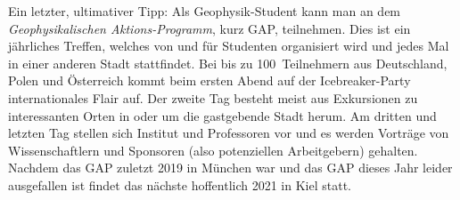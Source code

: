 \begin{multicols}{2}
Ein letzter, ultimativer Tipp: Als Geophysik-Student kann man an dem \emph{Geophysikalischen Aktions-Programm}, kurz GAP, teilnehmen.
Dies ist ein jährliches Treffen, welches von und für Studenten organisiert wird und jedes Mal in einer anderen Stadt stattfindet.
Bei bis zu 100~Teilnehmern aus Deutschland, Polen und Österreich kommt beim ersten Abend auf der Icebreaker-Party internationales Flair auf.
Der zweite Tag besteht meist aus Exkursionen zu interessanten Orten in oder um die gastgebende Stadt herum.
Am dritten und letzten Tag stellen sich Institut und Professoren vor und es werden Vorträge von Wissenschaftlern und Sponsoren (also potenziellen Arbeitgebern) gehalten.
Nachdem das GAP zuletzt 2019 in München war und das GAP dieses Jahr leider ausgefallen ist  findet das nächste hoffentlich 2021 in Kiel statt.

\end{multicols}



